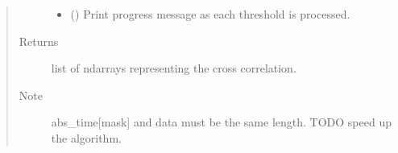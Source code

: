 \documentclass[letterpaper,10pt,english]{sphinxmanual}
\begin{document}
\begin{fulllineitems}
\begin{quote}
\begin{description}
\begin{itemize}
\item {} 
\sphinxAtStartPar
{} () \textendash{} Print progress message as each threshold is processed.

\end{itemize}

\item[{Returns}] \leavevmode
\sphinxAtStartPar
list of ndarrays representing the cross correlation.

\item[{Note}] \leavevmode
\sphinxAtStartPar
abs\_time{[}mask{]} and data must be the same length.
TODO speed up the algorithm.

\end{description}\end{quote}

\end{fulllineitems}

\end{document}
